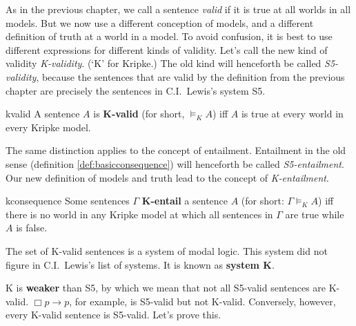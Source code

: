 As in the previous chapter, we call a sentence \emph{valid} if it is true at all
worlds in all models. But we now use a different conception of models, and a
different definition of truth at a world in a model. To avoid confusion, it is
best to use different expressions for different kinds of validity. Let's call
the new kind of validity \emph{K-validity}. (`K' for Kripke.) The old kind will
henceforth be called \emph{S5-validity}, because the sentences that are valid by
the definition from the previous chapter are precisely the sentences in C.I.\
Lewis's system S5.

\begin{definition}{}{kvalid}
  A sentence $A$ is \textbf{K-valid} (for short, $\models_K A$) iff $A$
  is true at every world in every Kripke model.
\end{definition}


The same distinction applies to the concept of entailment. Entailment in the old
sense (definition \ref{def:basicconsequence}) will henceforth be called
\emph{S5-entailment}. Our new definition of models and truth lead to the
concept of \emph{K-entailment}.

\begin{definition}{}{kconsequence}
  Some sentences $\Gamma$ \textbf{K-entail} a sentence $A$ (for short:
  $\Gamma \models_{K} A$) iff there is no world in any Kripke model at which all
  sentences in $\Gamma$ are true while $A$ is false.
\end{definition}

The set of K-valid sentences is a system of modal logic. This system did
not figure in C.I.\ Lewis's list of systems. It is known as \textbf{system K}.

K is \textbf{weaker} than S5, by which we mean that not all S5-valid
sentences are K-valid. $\Box p \to p$, for example, is S5-valid but not K-valid.
Conversely, however, every K-valid sentence is S5-valid. Let's prove this.

